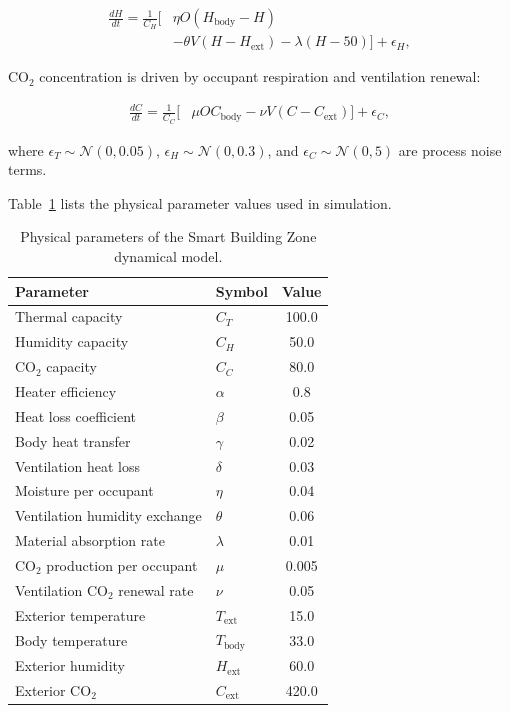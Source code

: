 \documentclass[conference]{IEEEtran}
\begin{document}
\begin{align}
\frac{dH}{dt} = \frac{1}{C_H}\Big[&\eta O(H_{\text{body}} - H) \nonumber\\
&- \theta V(H - H_{\text{ext}}) - \lambda(H - 50)\Big] + \epsilon_H,
\label{eq:dH}
\end{align}

CO$_2$ concentration is driven by occupant respiration and ventilation renewal:

\begin{align}
\frac{dC}{dt} = \frac{1}{C_C}\Big[&\mu O C_{\text{body}} - \nu V(C - C_{\text{ext}})\Big] + \epsilon_C,
\label{eq:dC}
\end{align}

where $\epsilon_T \sim \mathcal{N}(0, 0.05)$, $\epsilon_H \sim \mathcal{N}(0, 0.3)$, and $\epsilon_C \sim \mathcal{N}(0, 5)$ are process noise terms.

Table~\ref{tab:params} lists the physical parameter values used in simulation.

\begin{table}[t]
\centering
\caption{Physical parameters of the Smart Building Zone dynamical model.}
\label{tab:params}
\small
\begin{tabular}{llc}
\toprule
\textbf{Parameter} & \textbf{Symbol} & \textbf{Value} \\
\midrule
Thermal capacity & $C_T$ & 100.0 \\
Humidity capacity & $C_H$ & 50.0 \\
CO$_2$ capacity & $C_C$ & 80.0 \\
Heater efficiency & $\alpha$ & 0.8 \\
Heat loss coefficient & $\beta$ & 0.05 \\
Body heat transfer & $\gamma$ & 0.02 \\
Ventilation heat loss & $\delta$ & 0.03 \\
Moisture per occupant & $\eta$ & 0.04 \\
Ventilation humidity exchange & $\theta$ & 0.06 \\
Material absorption rate & $\lambda$ & 0.01 \\
CO$_2$ production per occupant & $\mu$ & 0.005 \\
Ventilation CO$_2$ renewal rate & $\nu$ & 0.05 \\
Exterior temperature & $T_{\text{ext}}$ & 15.0 \\
Body temperature & $T_{\text{body}}$ & 33.0 \\
Exterior humidity & $H_{\text{ext}}$ & 60.0 \\
Exterior CO$_2$ & $C_{\text{ext}}$ & 420.0 \\
\bottomrule
\end{tabular}
\end{table}
\end{document}
